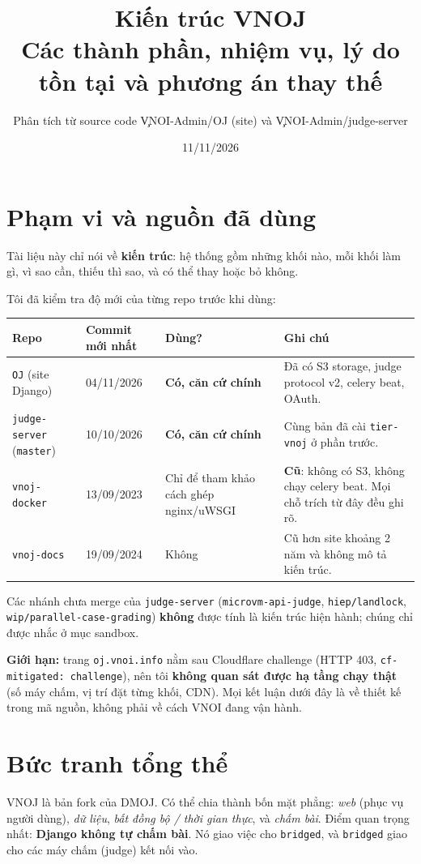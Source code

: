 \documentclass[11pt,a4paper]{article}
\title{\textbf{Kiến trúc VNOJ}\\[2pt]\large Các thành phần, nhiệm vụ, lý do tồn tại và phương án thay thế}
\author{Phân tích từ source code \c{VNOI-Admin/OJ} (site) và \c{VNOI-Admin/judge-server}}
\date{11/11/2026}
\renewcommand{\c}[1]{\texttt{#1}}
\begin{document}
\maketitle

\section{Phạm vi và nguồn đã dùng}
Tài liệu này chỉ nói về \textbf{kiến trúc}: hệ thống gồm những khối nào, mỗi khối làm gì, vì sao cần, thiếu thì sao, và có thể thay hoặc bỏ không.

Tôi đã kiểm tra độ mới của từng repo trước khi dùng:
\begin{center}\small
\begin{tabularx}{\textwidth}{@{}lllX@{}}
\toprule
Repo & Commit mới nhất & Dùng? & Ghi chú \\
\midrule
\c{OJ} (site Django) & 04/11/2026 & \textbf{Có, căn cứ chính} & Đã có S3 storage, judge protocol v2, celery beat, OAuth. \\
\c{judge-server} (\c{master}) & 10/10/2026 & \textbf{Có, căn cứ chính} & Cùng bản đã cài \c{tier-vnoj} ở phần trước. \\
\c{vnoj-docker} & 13/09/2023 & Chỉ để tham khảo cách ghép nginx/uWSGI & \textbf{Cũ}: không có S3, không chạy celery beat. Mọi chỗ trích từ đây đều ghi rõ. \\
\c{vnoj-docs} & 19/09/2024 & Không & Cũ hơn site khoảng 2 năm và không mô tả kiến trúc. \\
\bottomrule
\end{tabularx}
\end{center}
Các nhánh chưa merge của \c{judge-server} (\c{microvm-api-judge}, \c{hiep/landlock}, \c{wip/parallel-case-grading}) \textbf{không} được tính là kiến trúc hiện hành; chúng chỉ được nhắc ở mục sandbox.

\textbf{Giới hạn:} trang \c{oj.vnoi.info} nằm sau Cloudflare challenge (HTTP 403, \c{cf-mitigated: challenge}), nên tôi \textbf{không quan sát được hạ tầng chạy thật} (số máy chấm, vị trí đặt từng khối, CDN). Mọi kết luận dưới đây là về thiết kế trong mã nguồn, không phải về cách VNOI đang vận hành.

\section{Bức tranh tổng thể}
VNOJ là bản fork của DMOJ. Có thể chia thành bốn mặt phẳng: \emph{web} (phục vụ người dùng), \emph{dữ liệu}, \emph{bất đồng bộ / thời gian thực}, và \emph{chấm bài}. Điểm quan trọng nhất: \textbf{Django không tự chấm bài}. Nó giao việc cho \c{bridged}, và \c{bridged} giao cho các máy chấm (judge) kết nối vào.
\end{document}

